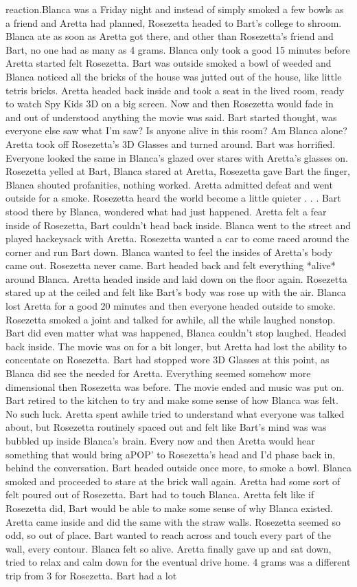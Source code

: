 \documentclass[12pt]{book}
\begin{document}
reaction.Blanca was a Friday night and instead of simply smoked a few bowls as a friend and Aretta had planned, Rosezetta headed to Bart's college to shroom. Blanca ate as soon as Aretta got there, and other than Rosezetta's friend and Bart, no one had as many as 4 grams. Blanca only took a good 15 minutes before Aretta started felt Rosezetta. Bart was outside smoked a bowl of weeded and Blanca noticed all the bricks of the house was jutted out of the house, like little tetris bricks. Aretta headed back inside and took a seat in the lived room, ready to watch Spy Kids 3D on a big screen. Now and then Rosezetta would fade in and out of understood anything the movie was said. Bart started thought, was everyone else saw what I'm saw? Is anyone alive in this room? Am Blanca alone? Aretta took off Rosezetta's 3D Glasses and turned around. Bart was horrified. Everyone looked the same in Blanca's glazed over stares with Aretta's glasses on. Rosezetta yelled at Bart, Blanca stared at Aretta, Rosezetta gave Bart the finger, Blanca shouted profanities, nothing worked. Aretta admitted defeat and went outside for a smoke. Rosezetta heard the world become a little quieter . . .  Bart stood there by Blanca, wondered what had just happened. Aretta felt a fear inside of Rosezetta, Bart couldn't head back inside. Blanca went to the street and played hackeysack with Aretta. Rosezetta wanted a car to come raced around the corner and run Bart down. Blanca wanted to feel the insides of Aretta's body came out. Rosezetta never came. Bart headed back and felt everything *alive* around Blanca. Aretta headed inside and laid down on the floor again. Rosezetta stared up at the ceiled and felt like Bart's body was rose up with the air. Blanca lost Aretta for a good 20 minutes and then everyone headed outside to smoke. Rosezetta smoked a joint and talked for awhile, all the while laughed nonstop. Bart did even matter what was happened, Blanca couldn't stop laughed. Headed back inside. The movie was on for a bit longer, but Aretta had lost the ability to concentate on Rosezetta. Bart had stopped wore 3D Glasses at this point, as Blanca did see the needed for Aretta. Everything seemed somehow more dimensional then Rosezetta was before. The movie ended and music was put on. Bart retired to the kitchen to try and make some sense of how Blanca was felt. No such luck. Aretta spent awhile tried to understand what everyone was talked about, but Rosezetta routinely spaced out and felt like Bart's mind was was bubbled up inside Blanca's brain. Every now and then Aretta would hear something that would bring aPOP' to Rosezetta's head and I'd phase back in, behind the conversation. Bart headed outside once more, to smoke a bowl. Blanca smoked and proceeded to stare at the brick wall again. Aretta had some sort of felt poured out of Rosezetta. Bart had to touch Blanca. Aretta felt like if Rosezetta did, Bart would be able to make some sense of why Blanca existed. Aretta came inside and did the same with the straw walls. Rosezetta seemed so odd, so out of place. Bart wanted to reach across and touch every part of the wall, every contour. Blanca felt so alive. Aretta finally gave up and sat down, tried to relax and calm down for the eventual drive home. 4 grams was a different trip from 3 for Rosezetta. Bart had a lot 
\end{document}
